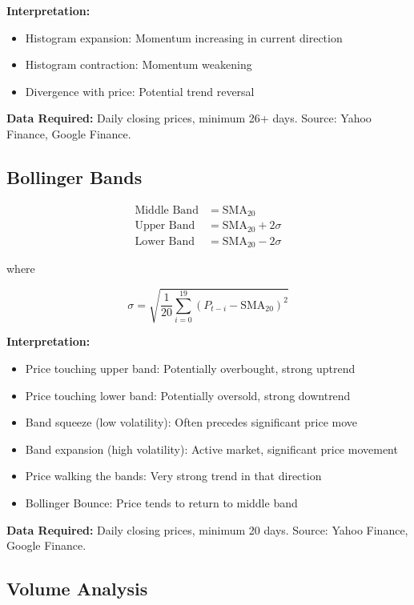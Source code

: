 \documentclass[11pt,a4paper]{article}
\begin{document}
\textbf{Interpretation:}
\begin{itemize}
    \item Histogram expansion: Momentum increasing in current direction
    \item Histogram contraction: Momentum weakening
    \item Divergence with price: Potential trend reversal
\end{itemize}

\textbf{Data Required:} Daily closing prices, minimum 26+ days. Source: Yahoo Finance, Google Finance.

\subsection{Bollinger Bands}

\begin{align}
\text{Middle Band} &= \text{SMA}_{20}\\
\text{Upper Band} &= \text{SMA}_{20} + 2\sigma\\
\text{Lower Band} &= \text{SMA}_{20} - 2\sigma
\end{align}

where

\begin{equation}
\sigma = \sqrt{\frac{1}{20}\sum_{i=0}^{19}(P_{t-i} - \text{SMA}_{20})^2}
\end{equation}

\textbf{Interpretation:}
\begin{itemize}
    \item Price touching upper band: Potentially overbought, strong uptrend
    \item Price touching lower band: Potentially oversold, strong downtrend
    \item Band squeeze (low volatility): Often precedes significant price move
    \item Band expansion (high volatility): Active market, significant price movement
    \item Price walking the bands: Very strong trend in that direction
    \item Bollinger Bounce: Price tends to return to middle band
\end{itemize}

\textbf{Data Required:} Daily closing prices, minimum 20 days. Source: Yahoo Finance, Google Finance.

\subsection{Volume Analysis}
\end{document}
